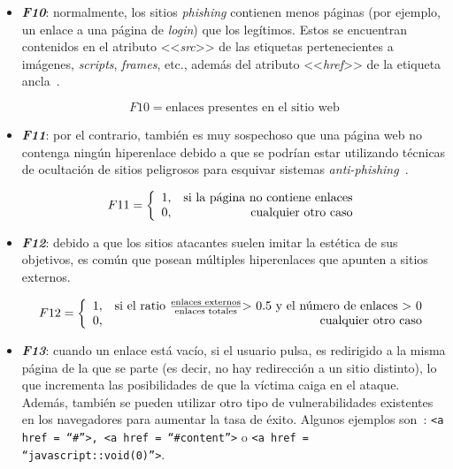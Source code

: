 \begin{itemize}
	\item \textit{\textbf{F10}}: normalmente, los sitios \textit{phishing} contienen menos páginas (por ejemplo, un enlace a una página de \textit{login}) que los legítimos. Estos se encuentran contenidos en el atributo <<\textit{src}>> de las etiquetas pertenecientes a imágenes, \textit{scripts}, \textit{frames}, etc., además del atributo <<\textit{href}>> de la etiqueta ancla~\cite{anclaMozilla}.
	
	\begin{equation}\label{eqn:phishing_f10} F10 = \text{enlaces presentes en el sitio web} \end{equation}
		
	\item \textit{\textbf{F11}}: por el contrario, también es muy sospechoso que una página web no contenga ningún hiperenlace debido a que se podrían estar utilizando técnicas de ocultación de sitios peligrosos para esquivar sistemas \textit{anti-phishing}~\cite{hiperlinkHidingTechniques}.

	\[F11 = \left\{ \begin{array}{lr} 1, & \text{si la página no contiene enlaces}\\ 
	0, & \text{\raggedright cualquier otro caso} \label{eqn:phishing_f11} \end{array}\right.\]
	
	\item \textit{\textbf{F12}}: debido a que los sitios atacantes suelen imitar la estética de sus objetivos, es común que posean múltiples hiperenlaces que apunten a sitios externos.

	\[F12 = \left\{ \begin{array}{lr} 1, & \text{si el ratio } \frac{\text{enlaces externos}}{\text{enlaces totales}} \text{> 0.5 y el número de enlaces > 0} \\
	0, & \text{\raggedright cualquier otro caso} \label{eqn:phishing_f12} \end{array}\right.\]


	\item \textit{\textbf{F13}}: cuando un enlace está vacío, si el usuario pulsa, es redirigido a la misma página de la que se parte (es decir, no hay redirección a un sitio distinto), lo que incrementa las posibilidades de que la víctima caiga en el ataque. Además, también se pueden utilizar otro tipo de vulnerabilidades existentes en los navegadores para aumentar la tasa de éxito. Algunos ejemplos son~\cite{featuresPhishing2018Gupta}: \texttt{<a href = “\#”>, <a href = “\#content”>} o \texttt{<a href = “javascript::void(0)”>}.


\end{itemize}
